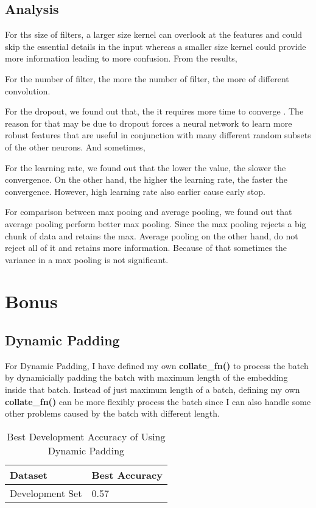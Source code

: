 \documentclass{article}
\begin{document}
\subsection{Analysis}
For ths size of filters, a larger size kernel can overlook at the features and could skip the essential details in the input whereas a smaller size kernel could provide more information leading to more confusion. From the results,

For the number of filter, the more the number of filter, the more of different convolution. 

For the dropout, we found out that, the it requires more time to converge . The reason for that may be due to dropout forces a neural network to learn more robust features that are useful in conjunction with many different random subsets of the other neurons. And sometimes, 

For the learning rate, we found out that the lower the value, the slower the convergence. On the other hand, the higher the learning rate, the faster the convergence. However, high learning rate also earlier cause early stop.

For comparison between max pooing and average pooling, we found out that average pooling perform better max pooling. Since the max pooling rejects a big chunk of data and retains the max. Average pooling on the other hand, do not reject all of it and retains more information. Because of that sometimes the variance in a max pooling is not significant.

\section{Bonus}

\subsection{Dynamic Padding}
For Dynamic Padding, I have defined my own \textbf{collate\_fn()} to process the batch by dynamicially padding the batch with maximum length of the embedding inside that batch. Instead of just maximum length of a batch, defining my own \textbf{collate\_fn()} can be more flexibly process the batch since I can also handle some other problems caused by the batch with different length.

\begin{table}[htb]
	\caption{Best Development Accuracy of Using Dynamic Padding}
	\label{sample-table}
	\centering
	\begin{tabular}{ll}
		\toprule
		\cmidrule{1-2}
		Dataset & Best Accuracy\\
		\midrule
		Development Set & 0.57  \\
		\bottomrule
	\end{tabular}
\end{table}
\end{document}
